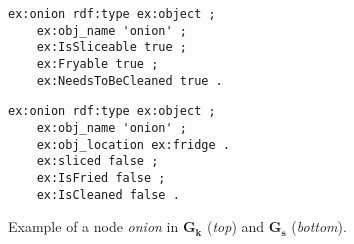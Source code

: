 \begin{figure}[tb]
\captionsetup{font=scriptsize}
\centering
    \begin{minipage}{0.3\textwidth}
        \begin{lstlisting}[basicstyle=\ttfamily\scriptsize]
ex:onion rdf:type ex:object ;
    ex:obj_name 'onion' ;
    ex:IsSliceable true ;
    ex:Fryable true ;
    ex:NeedsToBeCleaned true .
        \end{lstlisting}
    \end{minipage}
    \hfill

    \begin{minipage}{0.3\textwidth}
        \begin{lstlisting}[basicstyle=\ttfamily\scriptsize]
ex:onion rdf:type ex:object ;
    ex:obj_name 'onion' ;
    ex:obj_location ex:fridge .
    ex:sliced false ;
    ex:IsFried false ;
    ex:IsCleaned false .
        \end{lstlisting}
    \end{minipage}
    \setlength{\abovecaptionskip}{-2pt}
    \setlength{\belowcaptionskip}{-12pt}
    \caption{Example of a node \textit{onion} in $\mathbf{G_k}$ (\textit{top}) and $\mathbf{G_s}$ (\textit{bottom}).}
    \label{fig:kg-nodes}
    \vspace{-0.5em}
\end{figure}

